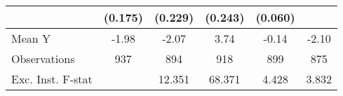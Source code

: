 {\begin{tabular}{l*{5}{c}}
            &     (0.175)         &     (0.229)         &     (0.243)         &     (0.060)         &                     \\
\midrule
Mean Y      &       -1.98         &       -2.07         &        3.74         &       -0.14         &       -2.10         \\
Observations&         937         &         894         &         918         &         899         &         875         \\
Exc. Inst. F-stat&                     &      12.351         &      68.371         &       4.428         &       3.832         \\
\bottomrule
\end{tabular}
}
